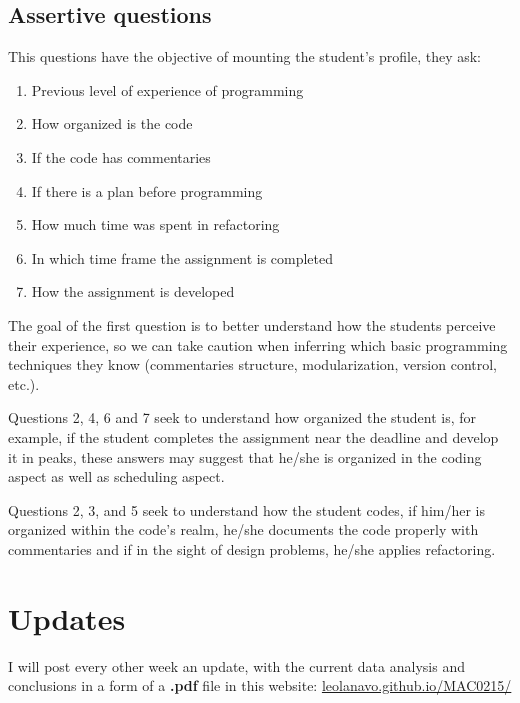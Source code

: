 \documentclass[a4paper, 12pt]{article}
\begin{document}
\subsection*{Assertive questions}
This questions have the objective of mounting the student's profile, 
they ask:
\begin{enumerate} 
\item Previous level of experience of programming
\item How organized is the code
\item If the code has commentaries
\item If there is a plan before programming
\item How much time was spent in refactoring
\item In which time frame the assignment is completed
\item How the assignment is developed
\end{enumerate}

The goal of the first question is to better understand how the students perceive their experience, 
so we can take caution when inferring which basic programming techniques they know (commentaries
structure, modularization, version control, etc.). 

Questions 2, 4, 6 and 7 seek to understand how organized the student is, for example, if the student 
completes the assignment near the deadline and develop it in peaks, these answers may suggest that 
he/she is organized in the coding aspect as well as scheduling aspect.

Questions 2, 3, and 5 seek to understand how the student codes, if him/her is organized within the
code's realm, he/she documents the code properly with commentaries and if in the sight of design problems, 
he/she applies refactoring.

\section*{Updates}
I will post every other week an update, with the current data analysis and conclusions
in a form of a \textbf{.pdf} file in this website: 
\url{leolanavo.github.io/MAC0215/}

\nocite{*}


\end{document}
